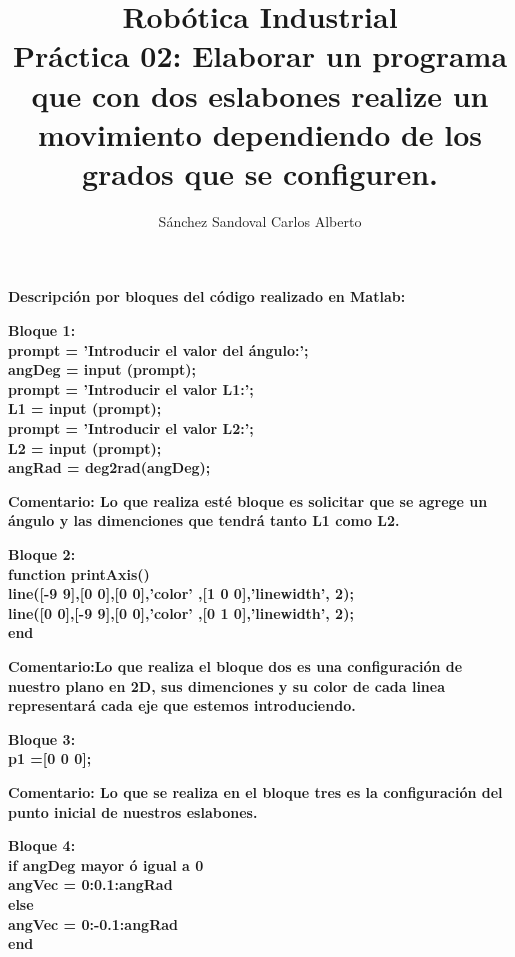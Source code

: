 \documentclass[10pt,a4paper]{article}
\author{Sánchez Sandoval Carlos Alberto}
\title{\textbf{Robótica Industrial}\\Práctica 02: Elaborar un programa que con dos eslabones realize un movimiento dependiendo de los grados que se configuren.}
\begin{document}
\maketitle
\begin{flushleft}
\textbf{Descripción por bloques del código realizado en Matlab:}
\end{flushleft}
\begin{flushleft}
\textbf{Bloque 1:\\
prompt = 'Introducir el valor del \'angulo:';\\
angDeg = input (prompt);\\
prompt = 'Introducir el valor L1:';\\
L1 = input (prompt);\\
prompt = 'Introducir el valor L2:';\\
L2 = input (prompt);\\
angRad = deg2rad(angDeg);}
\end{flushleft}
\begin{flushleft}
\textbf{Comentario: Lo que realiza esté bloque es solicitar que se agrege un ángulo y las dimenciones que tendrá tanto L1 como L2.}
\end{flushleft}
\begin{flushleft}
\textbf{Bloque 2:\\
function printAxis()\\
line([-9 9],[0 0],[0 0],'color' ,[1 0 0],'linewidth', 2);\\
line([0 0],[-9 9],[0 0],'color' ,[0 1 0],'linewidth', 2);\\
end}
\end{flushleft}
\begin{flushleft}
\textbf{Comentario:Lo que realiza el bloque dos es una configuración de nuestro plano en 2D, sus dimenciones y su color de cada linea representará cada eje que estemos introduciendo.}
\end{flushleft}
\begin{flushleft}
\textbf{Bloque 3:\\
p1 =[0 0 0];}
\end{flushleft}
\begin{flushleft}
\textbf{Comentario: Lo que se realiza en el bloque tres es la configuración del punto inicial de nuestros eslabones.}
\end{flushleft}
\begin{flushleft}
\textbf{Bloque 4:\\
if angDeg mayor \'o igual a 0\\
    angVec = 0:0.1:angRad\\
else\\
    angVec = 0:-0.1:angRad\\
end
}
\end{flushleft}
\end{document}
